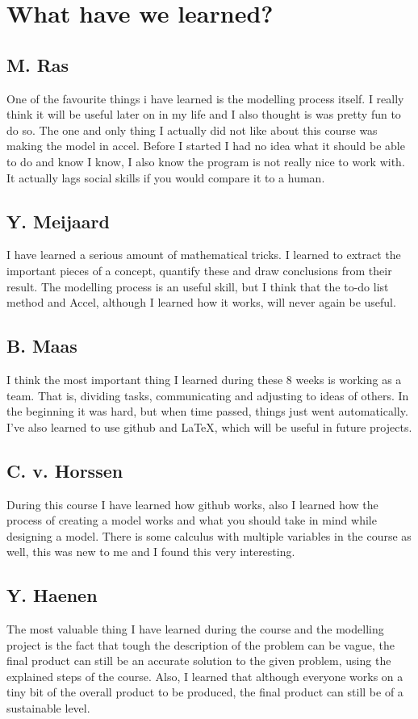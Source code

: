\documentclass[a4paper, 11pt, notitlepage]{report}
\begin{document}
\chapter{What have we learned?}
	\section*{M. Ras}
	One of the favourite things i have learned is the modelling process itself. I really think it will be useful later on in my life and I also thought is was pretty fun to do so. The one and only thing I actually did not like about this course was making the model in accel. Before I started I had no idea what it should be able to do and know I know, I also know the program is not really nice to work with. It actually lags social skills if you would compare it to a human.
	
	\section*{Y. Meijaard}
	I have learned a serious amount of mathematical tricks. I learned to extract the important pieces of a concept, quantify these and draw conclusions from their result. The modelling process is an useful skill, but I think that the to-do list method and Accel, although I learned how it works, will never again be useful.
	
	\section*{B. Maas}
	I think the most important thing I learned during these 8 weeks is working as a team. That is, dividing tasks, communicating and adjusting to ideas of others. In the beginning it was hard, but when time passed, things just went automatically. I've also learned to use github and LaTeX, which will be useful in future projects.

\section*{C. v. Horssen} During this course I have learned how github works, also I learned how the process of creating a model works and what you should take in mind while designing a model. There is some calculus with multiple variables in the course as well, this was new to me and I found this very interesting.

\section*{Y. Haenen}
The most valuable thing I have learned during the course and the modelling project is the fact that tough the description of the problem can be vague, the final product can still be an accurate solution to the given problem, using the explained steps of the course. Also, I learned that although everyone works on a tiny bit of the overall product to be produced, the final product can still be of a sustainable level.
\end{document}
